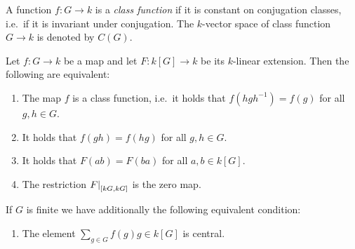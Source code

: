 % 
% 


\begin{definition}
  A function $f \colon G \to k$ is a \emph{class function} if it is constant on conjugation classes, i.e.\ if it is invariant under conjugation.
  The $k$-vector space of class function $G \to k$ is denoted by $C(G)$.
\end{definition}


\begin{lemma}
  \label{lemma: characterisation class functions}
  Let $f \colon G \to k$ be a map and let $F \colon k[G] \to k$ be its $k$-linear extension.
  Then the following are equivalent:
  \begin{enumerate}
    \item \label{enum: class function}
      The map $f$ is a class function, i.e.\ it holds that $f(h g h^{-1}) = f(g)$ for all $g, h \in G$.
    \item
      It holds that $f(gh) = f(hg)$ for all $g, h \in G$.
    \item
      It holds that $F(ab) = F(ba)$ for all $a, b \in k[G]$.
    \item
      The restriction $\restrict{F}{[kG,kG]}$ is the zero map.
  \end{enumerate}
  If $G$ is finite we have additionally the following equivalent condition:
  \begin{enumerate}[resume]
    \item
      \label{enum: center of group algebra}
      The element $\sum_{g \in G} f(g) g \in k[G]$ is central.
  \end{enumerate}
\end{lemma}


